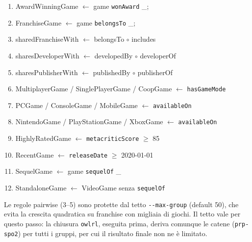 \begin{enumerate}[nosep]
  \item AwardWinningGame $\leftarrow$ game \texttt{wonAward} \_;
  \item FranchiseGame $\leftarrow$ game \texttt{belongsTo} \_;
  \item sharedFranchiseWith $\leftarrow$ belongsTo $\circ$ includes
  \item sharesDeveloperWith $\leftarrow$ developedBy $\circ$ developerOf
  \item sharesPublisherWith $\leftarrow$ publishedBy $\circ$ publisherOf
  \item MultiplayerGame / SinglePlayerGame / CoopGame $\leftarrow$ \texttt{hasGameMode}
  \item PCGame / ConsoleGame / MobileGame $\leftarrow$ \texttt{availableOn}
  \item NintendoGame / PlayStationGame / XboxGame $\leftarrow$ \texttt{availableOn}
  \item HighlyRatedGame $\leftarrow$ \texttt{metacriticScore} $\geq$ 85
  \item RecentGame $\leftarrow$ \texttt{releaseDate} $\geq$ 2020-01-01
  \item SequelGame $\leftarrow$ game \texttt{sequelOf} \_
  \item StandaloneGame $\leftarrow$ VideoGame senza \texttt{sequelOf}
\end{enumerate}

Le regole pairwise (3--5) sono protette dal tetto \texttt{-{}-max-group} (default 50), che evita la
crescita quadratica su franchise con migliaia di giochi. Il tetto vale per questo passo: la chiusura
\texttt{owlrl}, eseguita prima, deriva comunque le catene (\texttt{prp-spo2}) per tutti i gruppi, per cui
il risultato finale non ne \`e limitato.
